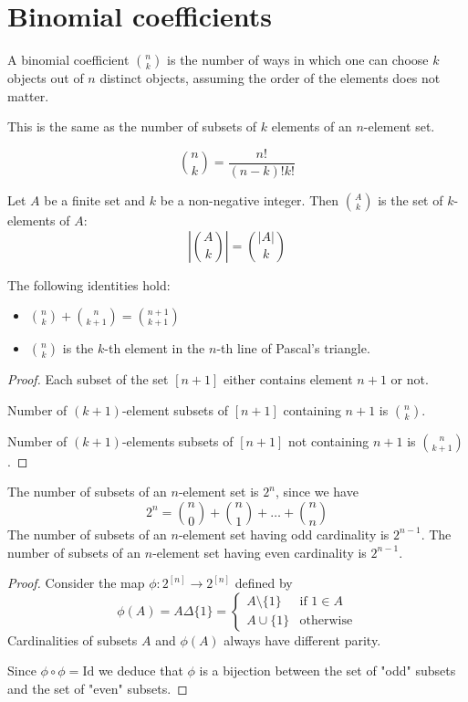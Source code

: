 \section{Binomial coefficients}
\begin{definition}
A binomial coefficient $n\choose k$ is the number of ways in which one can choose $k$ objects out of $n$ distinct objects, assuming the order of the elements does not matter.
\end{definition}
\begin{remark}
This is the same as the number of subsets of $k$ elements of an $n$-element set.
\end{remark}
\begin{proposition}
$$
{n\choose k}=\frac{n!}{(n-k)!k!}
$$
\end{proposition}
\begin{notation}
Let $A$ be a finite set and $k$ be a non-negative integer. Then $A\choose k$ is the set of $k$-elements of $A$:
$$
|{A\choose k}|={|A|\choose k}
$$
\end{notation}

\begin{proposition}
The following identities hold:
\begin{itemize}
\item ${n\choose k}+{n \choose k+1}={n+1 \choose k+1}$
\item $n \choose k$ is the $k$-th element in the $n$-th line of Pascal's triangle.
\end{itemize}
\end{proposition}
\begin{proof}
Each subset of the set $[n+1]$ either contains element $n+1$ or not. 

Number of $(k+1)$-element subsets of $[n+1]$ containing $n+1$ is $n\choose k$.

Number of $(k+1)$-elements subsets of $[n+1]$ not containing $n+1$ is $n \choose k+1$.
\end{proof}
\begin{proposition}
The number of subsets of an $n$-element set is $2^{n}$, since we have
$$
2^{n}={n\choose 0}+{n\choose 1}+\dots+{n\choose n}
$$
The number of subsets of an $n$-element set having odd cardinality is $2^{n-1}$. The number of subsets of an $n$-element set having even cardinality is $2^{n-1}$.
\end{proposition}
\begin{proof}
Consider the map $\phi:2^{[n]}\to 2^{[n]}$ defined by
$$
\phi(A)=A\Delta \{ 1 \}=\begin{cases}
A\setminus \{ 1 \} & \text{if }1\in A \\
A\cup \{ 1 \} & \text{otherwise}
\end{cases}
$$
Cardinalities of subsets $A$ and $\phi(A)$ always have different parity.

Since $\phi \circ\phi=\mathrm{Id}$ we deduce that $\phi$ is a bijection between the set of "odd" subsets and the set of "even" subsets.
\end{proof}

